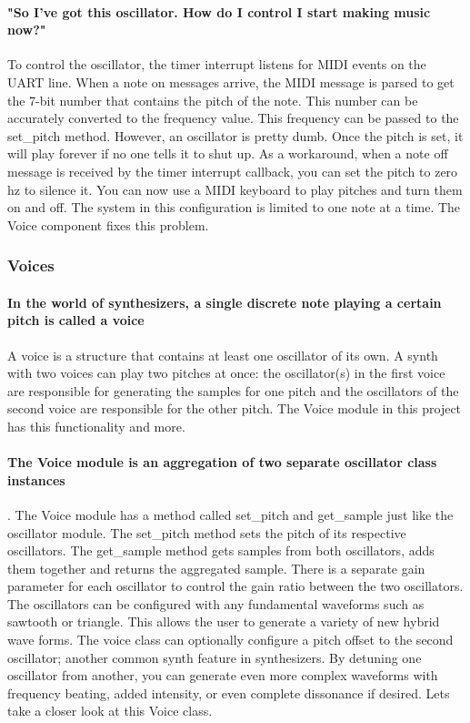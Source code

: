 \documentclass[acmlarge,screen]{acmart}
\begin{document}
	\paragraph{"So I've got this oscillator. How do I control I start making music now?"} To control the oscillator, the timer interrupt listens for MIDI events on the UART line. When a note on messages arrive, the MIDI message is parsed to get the 7-bit number that contains the pitch of the note. This number can be accurately converted to the frequency value. This frequency can be passed to the set\_pitch method. However, an oscillator is pretty dumb. Once the pitch is set, it will play forever if no one tells it to shut up. As a workaround, when a note off message is received by the timer interrupt callback, you can set the pitch to zero hz to silence it. You can now use a MIDI keyboard to play pitches and turn them on and off. The system in this configuration is limited to one note at a time. The Voice component fixes this problem.
	
	\subsubsection{Voices}
	\paragraph{In the world of synthesizers, a single discrete note playing a certain pitch is called a voice} A voice is a structure that contains at least one oscillator of its own. A synth with two voices can play two pitches at once: the oscillator(s) in the first voice are responsible for generating the samples for one pitch and the oscillators of the second voice are responsible for the other pitch. The Voice module in this project has this functionality and more.
	
	\paragraph{The Voice module is an aggregation of two separate oscillator class instances}. The Voice module has a method called set\_pitch and get\_sample just like the oscillator module. The set\_pitch method sets the pitch of its respective oscillators. The get\_sample method gets samples from both oscillators, adds them together and returns the aggregated sample. There is a separate gain parameter for each oscillator to control the gain ratio between the two oscillators. The oscillators can be configured with any fundamental waveforms such as sawtooth or triangle. This allows the user to generate a variety of new hybrid wave forms. The voice class can optionally configure a pitch offset to the second oscillator; another common synth feature in synthesizers. By detuning one oscillator from another, you can generate even more complex waveforms with frequency beating, added intensity, or even complete dissonance if desired. Lets take a closer look at this Voice class.
	
\end{document}
